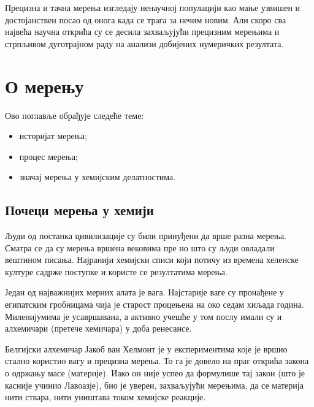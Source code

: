 \begin{savequote}
	Прецизна и тачна мерења изгледају ненаучној популацији
	као мање узвишен и достојанствен посао од онога када
	се трага за нечим новим. Али скоро сва највећа научна
	открића су се десила захваљујући прецизним мерењима и
	стрпљивом дуготрајном раду на анализи добијених нумеричких
	резултата.
\end{savequote}
\chapter{О мерењу}

\begin{sazetak}
  Ово поглавље обрађује следеће теме:\\[-3mm]
  \begin{itemize}
  \item историјат мерења;
  \item процес мерења;
  \item значај мерења у хемијским делатностима.
  \end{itemize}
\end{sazetak}

\section{Почеци мерења у хемији}

Људи од постанка цивилизације су били принуђени да врше разна мерења.
Сматра се да су мерења вршена вековима пре но што су људи овладали
вештином писања. Најранији хемијски списи који потичу из времена
хеленске културе садрже поступке и користе се резултатима мерења.

Један од најважнијих мерних алата је вага. Најстарије ваге су
пронађене у египатским гробницама чија је старост процењена на
око седам хиљада година. Миленијумима је усавршавана, а активно
учешће у том послу имали су и алхемичари (претече хемичара) у доба
ренесансе.

Белгијски алхемичар Јакоб ван Хелмонт је у експериментима које је
вршио стално користио вагу и прецизна мерења. То га је довело на
праг открића закона о одржању масе (материје). Иако он није успео
да формулише тај закон (што је касније учинио Лавоазје), био је
уверен, захваљујући мерењима, да се материја нити ствара, нити
уништава током хемијске реакције.

